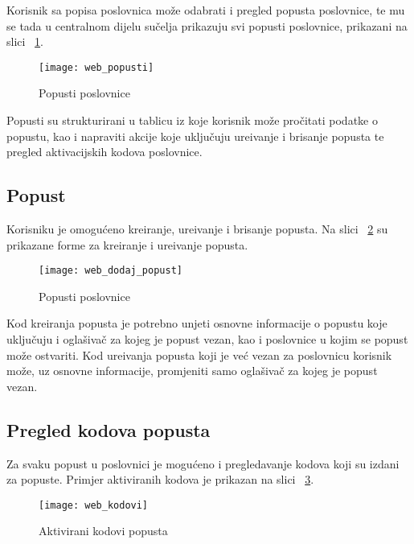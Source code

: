 Korisnik sa popisa poslovnica mo\v{z}e odabrati i pregled popusta poslovnice, te mu se tada u centralnom dijelu su\v{c}elja prikazuju svi popusti poslovnice, prikazani na slici ~\ref{fig:web_popusti}.

\begin{figure}[!htbp]
	\begin{center}
 \texttt{[image: web\_popusti]}
 \caption{Popusti poslovnice}
 \label{fig:web_popusti}
	\end{center}
\end{figure}

Popusti su strukturirani u tablicu iz koje korisnik mo\v{z}e pro\v{c}itati podatke o popustu, kao i napraviti akcije koje uklju\v{c}uju ure\dj ivanje i brisanje popusta te pregled aktivacijskih kodova poslovnice.


\subsection{Popust}

Korisniku je omogu\'{c}eno kreiranje, ure\dj ivanje i brisanje popusta. Na slici ~\ref{fig:web_dodaj_popust} su prikazane forme za kreiranje i ure\dj ivanje popusta.

\begin{figure}[!htbp]
	\begin{center}
 \texttt{[image: web\_dodaj\_popust]}
 \caption{Popusti poslovnice}
 \label{fig:web_dodaj_popust}
	\end{center}
\end{figure}
Kod kreiranja popusta je potrebno unjeti osnovne informacije o popustu koje uklju\v{c}uju i ogla\v{s}iva\v{c} za kojeg je popust vezan, kao i poslovnice u kojim se popust mo\v{z}e ostvariti. Kod ure\dj ivanja popusta koji je ve\'{c} vezan za poslovnicu korisnik mo\v{z}e, uz osnovne informacije, promjeniti samo ogla\v{s}iva\v{c} za kojeg je popust vezan.


\subsection{Pregled kodova popusta}
Za svaku popust u poslovnici je mogu\'{c}eno i pregledavanje kodova koji su izdani za popuste. Primjer aktiviranih kodova je prikazan na slici ~\ref{fig:web_kodovi}.

\begin{figure}[!htbp]
	\begin{center}
 \texttt{[image: web\_kodovi]}
 \caption{Aktivirani kodovi popusta}
 \label{fig:web_kodovi}
	\end{center}
\end{figure}

